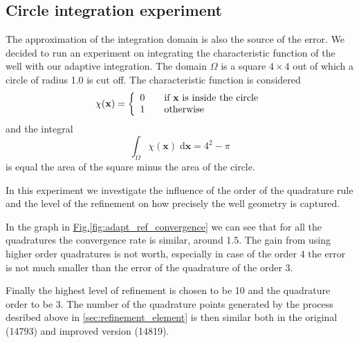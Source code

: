 \documentclass[preprint,12pt,authoryear]{elsarticle}
\newcommand{\fig}[1]{\hyperref[#1]{Fig.\ref{#1}}}
\newcommand{\dd}{\; \mathrm{d}}
\newcommand{\bx}{\mathbf{x}}
\begin{document}
\subsection{Circle integration experiment}
The approximation of the integration domain is also the source of the error. We decided to run 
an experiment on integrating the characteristic function of the well with our adaptive integration.
The domain $\Omega$ is a square $4\times4$ out of which a circle of radius 1.0 is cut off. The characteristic 
function is considered
\begin{equation}
  \chi(\bx) = \left\{
    \begin{array}{l l}
      0 & \quad \textrm{if } \bx \textrm{ is inside the circle}\\
      1 & \quad \textrm{otherwise}
  \end{array} \right.
\end{equation}
and the integral 
\begin{equation}
  \int_{\Omega}\chi(\bx) \dd\bx = 4^2 - \pi
\end{equation}
is equal the area of the square minus the area of the circle.

In this experiment we investigate the influence of the order of the quadrature rule and the level of
the refinement on how precisely the well geometry is captured.

In the graph in \fig{fig:adapt_ref_convergence} we can see that for all the quadratures the convergence rate
is similar, around 1.5. The gain from using higher order quadratures is not worth, especially in case 
of the order 4 the error is not much smaller than the error of the quadrature of the order 3. 

Finally the highest level of refinement is chosen to be 10 and the quadrature order to be 3. The number of
the quadrature points generated by the process desribed above in \ref{sec:refinement_element} is then similar 
both in the original (14793) and improved version (14819).
\end{document}
